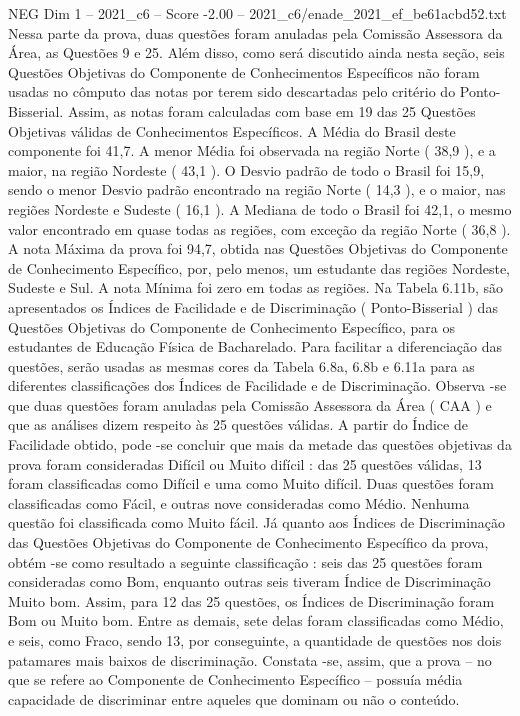 \begin{textsample}{NEG Dim 1 – 2021\_c6 – Score -2.00 – 2021\_c6/enade\_2021\_ef\_be61acbd52.txt}
Nessa parte da prova, duas questões foram anuladas pela Comissão Assessora da Área, as Questões 9 e 25.
Além disso, como será discutido ainda nesta seção, seis Questões Objetivas do Componente de Conhecimentos Específicos não foram usadas no cômputo das notas por terem sido descartadas pelo critério do Ponto-Bisserial.
Assim, as notas foram calculadas com base em 19 das 25 Questões Objetivas válidas de Conhecimentos Específicos.
A Média do Brasil deste componente foi 41,7.
A menor Média foi observada na região Norte ( 38,9 ), e a maior, na região Nordeste ( 43,1 ).
O Desvio padrão de todo o Brasil foi 15,9, sendo o menor Desvio padrão encontrado na região Norte ( 14,3 ), e o maior, nas regiões Nordeste e Sudeste ( 16,1 ).
A Mediana de todo o Brasil foi 42,1, o mesmo valor encontrado em quase todas as regiões, com exceção da região Norte ( 36,8 ).
A nota Máxima da prova foi 94,7, obtida nas Questões Objetivas do Componente de Conhecimento Específico, por, pelo menos, um estudante das regiões Nordeste, Sudeste e Sul.
A nota Mínima foi zero em todas as regiões.
Na Tabela 6.11b, são apresentados os Índices de Facilidade e de Discriminação ( Ponto-Bisserial ) das Questões Objetivas do Componente de Conhecimento Específico, para os estudantes de Educação Física de Bacharelado.
Para facilitar a diferenciação das questões, serão usadas as mesmas cores da Tabela 6.8a, 6.8b e 6.11a para as diferentes classificações dos Índices de Facilidade e de Discriminação.
Observa -se que duas questões foram anuladas pela Comissão Assessora da Área ( CAA ) e que as análises dizem respeito às 25 questões válidas.
A partir do Índice de Facilidade obtido, pode -se concluir que mais da metade das questões objetivas da prova foram consideradas Difícil ou Muito difícil : das 25 questões válidas, 13 foram classificadas como Difícil e uma como Muito difícil.
Duas questões foram classificadas como Fácil, e outras nove consideradas como Médio.
Nenhuma questão foi classificada como Muito fácil.
Já quanto aos Índices de Discriminação das Questões Objetivas do Componente de Conhecimento Específico da prova, obtém -se como resultado a seguinte classificação : seis das 25 questões foram consideradas como Bom, enquanto outras seis tiveram Índice de Discriminação Muito bom.
Assim, para 12 das 25 questões, os Índices de Discriminação foram Bom ou Muito bom.
Entre as demais, sete delas foram classificadas como Médio, e seis, como Fraco, sendo 13, por conseguinte, a quantidade de questões nos dois patamares mais baixos de discriminação.
Constata -se, assim, que a prova – no que se refere ao Componente de Conhecimento Específico – possuía média capacidade de discriminar entre aqueles que dominam ou não o conteúdo.

\end{textsample}
